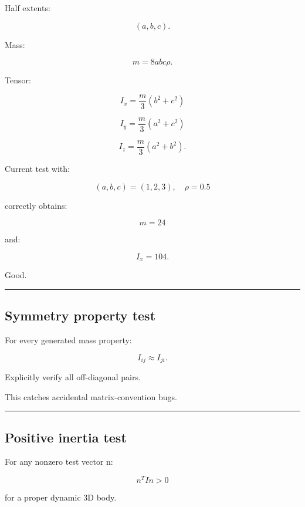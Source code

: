 \hypertarget{06-engine-ii-ch039-box-test}{}

Half extents:

\[
(a,b,c).
\]

Mass:

\[
m=8abc\rho.
\]

Tensor:

\[
I_x
=
\frac m3(b^2+c^2)
\]

\[
I_y
=
\frac m3(a^2+c^2)
\]

\[
I_z
=
\frac m3(a^2+b^2).
\]

Current test with:

\[
(a,b,c)=(1,2,3),
\quad
\rho=0.5
\]

correctly obtains:

\[
m=24
\]

and:

\[
I_x=104.
\]

Good.

\begin{center}\rule{0.5\linewidth}{0.5pt}\end{center}

\subsection{Symmetry property test}\label{06-engine-ii-ch039-symmetry-property-test}

\hypertarget{06-engine-ii-ch039-symmetry-property-test}{}

For every generated mass property:

\[
\boxed{
I_{ij}\approx I_{ji}.
}
\]

Explicitly verify all off-diagonal pairs.

This catches accidental matrix-convention bugs.

\begin{center}\rule{0.5\linewidth}{0.5pt}\end{center}

\subsection{Positive inertia test}\label{06-engine-ii-ch039-positive-inertia-test}

\hypertarget{06-engine-ii-ch039-positive-inertia-test}{}

For any nonzero test vector n:

\[
\boxed{
n^TIn>0
}
\]

for a proper dynamic 3D body.

